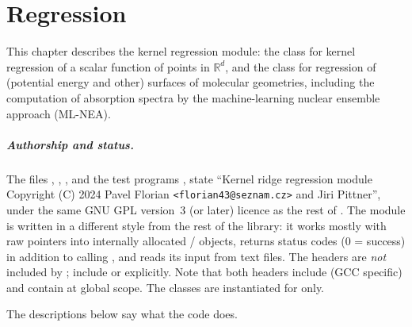 \chapter{Regression}\label{ch:regression}

This chapter describes the kernel regression module: the class  for kernel
regression of a scalar function of points in $\mathbb R^d$, and the class  for
regression of (potential energy and other) surfaces of molecular geometries, including the
computation of absorption spectra by the machine-learning nuclear ensemble approach (ML-NEA).

\paragraph{Authorship and status.} The files , ,
,  and the test programs ,
 state ``Kernel ridge regression module Copyright (C) 2024 Pavel Florian
\texttt{<florian43@seznam.cz>} and Jiri Pittner'', under the same GNU GPL version~3 (or later)
licence as the rest of \LA{}. The module is written in a different style from the rest of the
library: it works mostly with raw pointers into internally allocated /
objects, returns  status codes (0 = success) in addition to calling
, and reads its input from text files. The headers are \emph{not} included by
; include  or  explicitly. Note that both headers
include  (GCC specific) and contain  at global
scope. The classes are instantiated for  only.

The descriptions below say what the code does.

